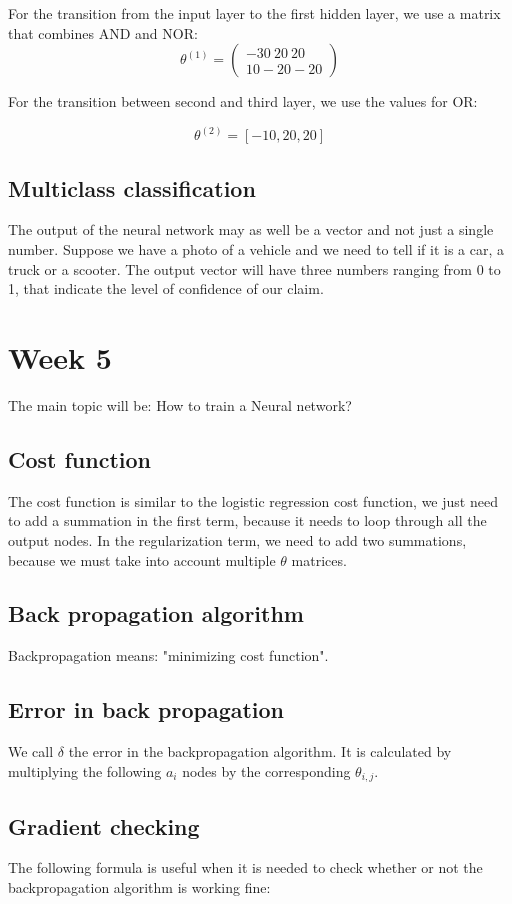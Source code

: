 \documentclass{article}
\begin{document}
For the transition from the input layer to the first hidden layer, we use a matrix
that combines AND and NOR:
$$ \theta^{(1)} = \begin{pmatrix} -30\ 20\ 20\\ 10 -20 -20\end{pmatrix} $$

For the transition between second and third layer, we use the values for OR:

$$ \theta^{(2)} = [-10,20,20]$$

\subsection{Multiclass classification}

The output of the neural network may as well be a vector and not just a single
number. Suppose we have a photo of a vehicle and we need to tell if it is a car,
a truck or a scooter. The output vector will have three numbers ranging from 0
to 1, that indicate the level of confidence of our claim.

\section{Week 5}
The main topic will be: How to train a Neural network?
\subsection{Cost function}
The cost function is similar to the logistic regression cost function, we just
need to add a summation in the first term, because it needs to loop through all
the output nodes. In the regularization term, we need to add two summations,
because we must take into account multiple $\theta$ matrices.
\subsection{Back propagation algorithm}
Backpropagation means: "minimizing cost function".
\subsection{Error in back propagation}
We call $\delta$ the error in the backpropagation algorithm. It is calculated by
multiplying the following $a_i$ nodes by the corresponding $\theta_{i,j}$.

\subsection{Gradient checking}
The following formula is useful when it is needed to check whether or not the
backpropagation algorithm is working fine:
\end{document}
